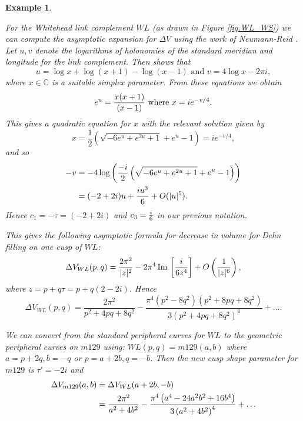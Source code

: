 \documentclass[reqno]{amsproc}  %
\newtheorem{ex}[prop]{\bf Example}
\def\C{\mathbb{C}}
\begin{document}
\begin{ex} \label{m129_NZ4}
{\em For the Whitehead link complement $WL$ (as drawn in Figure \ref{fig.WL_WS})
we can compute the asymptotic expansion for $\Delta V$ using the
work of Neumann-Reid \cite{NR}.  Let  $u,v$ denote the  logarithms of holonomies of the 
 standard meridian and longitude for the link complement. Then \cite{NR} shows that
 $$u = \log x + \log(x+1) - \log(x-1) \text{ and } v = 4 \log x - 2\pi i,$$
 where $x \in \C$ is a suitable simplex parameter. From these equations we
 obtain  $$e^u = { x(x+1) \over (x-1)} \text{ where } x = i e^{-v/4}.$$
 This gives a quadratic equation for $x$ with the relevant solution given by
$$x=\frac{1}{2} \left(\sqrt{-6 e^u+e^{2 u}+1}+e^u-1\right) = i e^{-v/4},$$
and so
\begin{align} \label{eq32}
-v &= -4 \log\left(\frac{-i}{2} \left(\sqrt{-6 e^u+e^{2 u}+1}+e^u-1\right)\right) \notag\\
&= (-2+2i) u + {i u^3 \over 6} +  O(|u|^5) .
\end{align}
Hence $c_1 = -\tau = (-2+2i)$ and $c_3= { i \over 6}$ in our previous notation.

\smallskip
This gives the following asymptotic formula for decrease in volume
for Dehn filling on one cusp of $WL$:
\begin{equation}  \label{eq33}
\Delta V_{WL} (p,q)=  
{ 2 \pi^2 \over |z|^2} -
{2 \pi^4}\,\text{Im}\, \left[  { i \over 6 z^4}\right] + O \left({1 \over |z|^6}\right),
\end{equation}
where  $z =  p + q \tau = p + q (2-2i)$.
Hence
\begin{equation}  \label{eq34}
\Delta V_{WL}(p,q)=
\frac{2 \pi ^2}{p^2+4 p q+8 q^2}-\frac{\pi ^4 \left(p^2-8 q^2\right) \left(p^2+8 p q+8 q^2\right)}{3 \left(p^2+4 p q+8
   q^2\right)^4} + \ldots.
\end{equation}

We can convert from the standard peripheral curves for $WL$
 to the geometric peripheral curves on $m129$ using:
$WL(p,q)=m129(a,b)$ where $a=p+2q,  b=-q$ or $p=a+2b,q = -b$.
Then the new cusp shape parameter for  $m129$ is $\tau' = -2 i$ and
\begin{align}\label{eq35}
\Delta V_{m129}(a,b) &= \Delta V_{WL}(a + 2 b, -b) \notag\\
&= \frac{2 \pi ^2}{a^2+4 b^2} -\frac{\pi ^4 \left(a^4-24 a^2 b^2+16 b^4\right)}{3 \left(a^2+4 b^2\right)^4}
+ \ldots
\end{align}

}
\end{ex}
\end{document}
